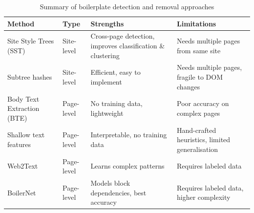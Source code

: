 \begin{table}[h]
    \centering
    \small
    \renewcommand{\arraystretch}{1.4}
    \begin{tabularx}{\textwidth}{p{4cm} p{2.2cm} X X}
        \toprule
        \textbf{Method} & \textbf{Type} & \textbf{Strengths} & \textbf{Limitations} \\
        \midrule
        Site Style Trees (SST)\cite{yi2003eliminating} & Site-level & Cross-page detection, improves classification \& clustering & Needs multiple pages from same site \\
        Subtree hashes\cite{gibson2005volume} & Site-level & Efficient, easy to implement & Needs multiple pages, fragile to DOM changes \\
        Body Text Extraction (BTE)\cite{vogels2018web2text} & Page-level & No training data, lightweight & Poor accuracy on complex pages \\
        Shallow text features\cite{kohlschutter2010boilerplate} & Page-level & Interpretable, no training data & Hand-crafted heuristics, limited generalisation \\
        Web2Text\cite{vogels2018web2text} & Page-level & Learns complex patterns & Requires labeled data \\
        BoilerNet\cite{leonhardt2020boilerplate} & Page-level & Models block dependencies, best accuracy & Requires labeled data, higher complexity \\
        \bottomrule
    \end{tabularx}
    \caption{Summary of boilerplate detection and removal approaches}
    \label{tab:boilerplate_summary}
\end{table}
